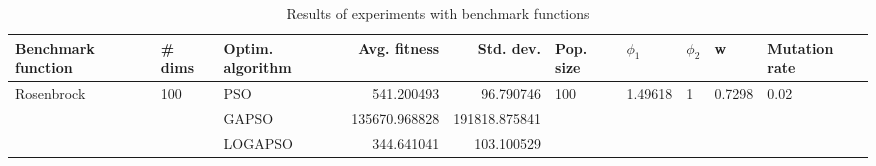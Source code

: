 \begin{table}
\centering
\caption{Results of experiments with benchmark functions}
\begin{tabular}{lllrrlllll}
\toprule
         Benchmark function &              \# dims & Optim. algorithm &  Avg. fitness &     Std. dev. &            Pop. size &               $\phi_{1}$ &         $\phi_{2}$ &                       w &         Mutation rate \\
\midrule
\multirow{3}{*}{Rosenbrock} & \multirow{3}{*}{100} &              PSO &    541.200493 &     96.790746 & \multirow{3}{*}{100} & \multirow{3}{*}{1.49618} & \multirow{3}{*}{1} & \multirow{3}{*}{0.7298} & \multirow{3}{*}{0.02} \\
                            &                      &            GAPSO & 135670.968828 & 191818.875841 &                      &                          &                    &                         &                       \\
                            &                      &          LOGAPSO &    344.641041 &    103.100529 &                      &                          &                    &                         &                       \\
\bottomrule
\end{tabular}
\end{table}

